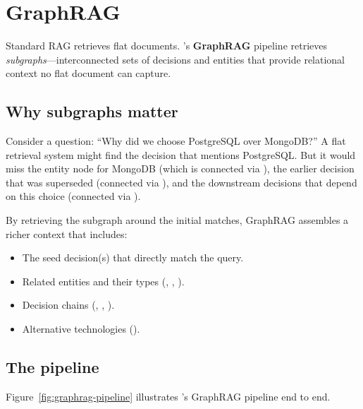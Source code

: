 \section{GraphRAG}
\label{sec:graphrag}

Standard RAG retrieves flat documents. \sysname{}'s \textbf{GraphRAG} pipeline
retrieves \emph{subgraphs}---interconnected sets of decisions and entities that
provide relational context no flat document can capture.

\subsection{Why subgraphs matter}

Consider a question: ``Why did we choose PostgreSQL over MongoDB?'' A flat
retrieval system might find the decision that mentions PostgreSQL. But it would
miss the entity node for MongoDB (which is connected via
), the earlier decision that was superseded (connected via
), and the downstream decisions that depend on this choice
(connected via ).

By retrieving the subgraph around the initial matches, GraphRAG assembles a
richer context that includes:

\begin{itemize}
    \item The seed decision(s) that directly match the query.
    \item Related entities and their types (, ,
          ).
    \item Decision chains (, ,
          ).
    \item Alternative technologies ().
\end{itemize}

\subsection{The pipeline}

Figure~\ref{fig:graphrag-pipeline} illustrates \sysname{}'s GraphRAG pipeline
end to end.


